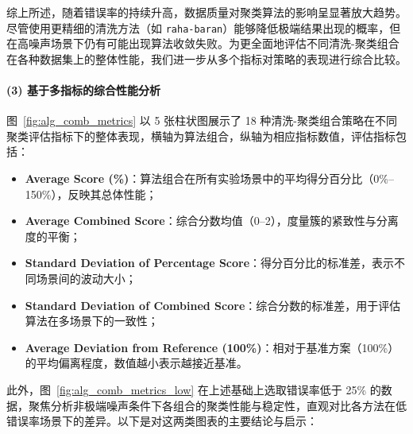 \documentclass[10pt]{article} %
\numberwithin{equation}{section}
\begin{document}
\noindent
综上所述，随着错误率的持续升高，数据质量对聚类算法的影响呈显著放大趋势。尽管使用更精细的清洗方法（如 \texttt{raha-baran}）能够降低极端结果出现的概率，但在高噪声场景下仍有可能出现算法收敛失败。为更全面地评估不同清洗-聚类组合在各种数据集上的整体性能，我们进一步从多个指标对策略的表现进行综合比较。

\paragraph{(3) 基于多指标的综合性能分析}
图~\ref{fig:alg_comb_metrics} 以 5 张柱状图展示了 18 种清洗-聚类组合策略在不同聚类评估指标下的整体表现，横轴为算法组合，纵轴为相应指标数值，评估指标包括：
\begin{itemize}
    \item \textbf{Average Score (\%)}：算法组合在所有实验场景中的平均得分百分比（0\%--150\%），反映其总体性能；
    \item \textbf{Average Combined Score}：综合分数均值（0--2），度量簇的紧致性与分离度的平衡；
    \item \textbf{Standard Deviation of Percentage Score}：得分百分比的标准差，表示不同场景间的波动大小；
    \item \textbf{Standard Deviation of Combined Score}：综合分数的标准差，用于评估算法在多场景下的一致性；
    \item \textbf{Average Deviation from Reference (100\%)}：相对于基准方案（100\%）的平均偏离程度，数值越小表示越接近基准。
\end{itemize}

此外，图~\ref{fig:alg_comb_metrics_low} 在上述基础上选取错误率低于 25\% 的数据，聚焦分析非极端噪声条件下各组合的聚类性能与稳定性，直观对比各方法在低错误率场景下的差异。以下是对这两类图表的主要结论与启示：
\end{document}
